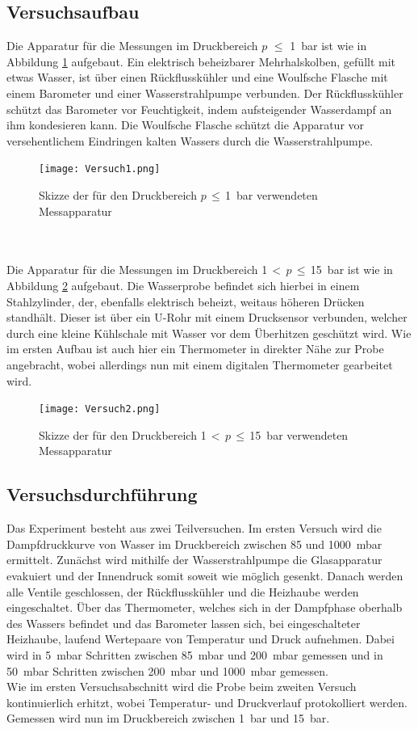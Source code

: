 \documentclass[
  bibliography=totoc,     %
  captions=tableheading,  %
  titlepage=firstiscover, %
]{scrartcl}
\begin{document}
\subsection{Versuchsaufbau}
\label{sec:versuchsaufbau}
Die Apparatur für die Messungen im Druckbereich $p$ $\le$ \SI{1}{\bar} ist
wie in Abbildung \ref{fig:versuch1} aufgebaut.
Ein elektrisch beheizbarer Mehrhalskolben, gefüllt mit etwas Wasser, ist über
einen Rückflusskühler und eine Woulfsche Flasche mit einem Barometer und einer
Wasserstrahlpumpe verbunden. Der Rückflusskühler schützt das Barometer vor
Feuchtigkeit, indem aufsteigender Wasserdampf an ihm kondesieren kann. Die
Woulfsche Flasche schützt die Apparatur vor versehentlichem Eindringen kalten
Wassers durch die Wasserstrahlpumpe.
\begin{figure}[htb]
  \centering
  \texttt{[image: Versuch1.png]}
  \caption{Skizze der für den Druckbereich $p$\,$\le$\,\SI{1}{\bar} verwendeten Messapparatur \cite{anleitung}}
  \label{fig:versuch1}
\end{figure}\\
\\
Die Apparatur für die Messungen im Druckbereich \num{1}\,$<$\,$p$\,$\le$\,\SI{15}{\bar}
ist wie in Abbildung \ref{fig:versuch2} aufgebaut.
Die Wasserprobe befindet sich hierbei in einem Stahlzylinder, der, ebenfalls
elektrisch beheizt, weitaus höheren Drücken standhält. Dieser ist über ein
U-Rohr mit einem Drucksensor verbunden, welcher durch eine kleine Kühlschale mit
Wasser vor dem Überhitzen geschützt wird. Wie im ersten Aufbau ist auch hier ein
Thermometer in direkter Nähe zur Probe angebracht, wobei allerdings nun mit
einem digitalen Thermometer gearbeitet wird.
\begin{figure}[htb]
  \centering
  \texttt{[image: Versuch2.png]}
  \caption{Skizze der für den Druckbereich \num{1}\,$<$\,$p$\,$\le$\,\SI{15}{\bar} verwendeten Messapparatur \cite{anleitung}}
  \label{fig:versuch2}
\end{figure}
\subsection{Versuchsdurchführung}
\label{sec:versuchsdurcführung}
Das Experiment besteht aus zwei Teilversuchen. Im ersten Versuch wird die
Dampfdruckkurve von Wasser im Druckbereich zwischen \num{85} und
\SI{1000}{\milli\bar} ermittelt. Zunächst wird mithilfe der Wasserstrahlpumpe
die Glasapparatur evakuiert und der Innendruck somit soweit wie möglich gesenkt.
Danach werden alle Ventile geschlossen, der Rückflusskühler und die Heizhaube
werden eingeschaltet. Über das Thermometer, welches sich in der Dampfphase
oberhalb des Wassers befindet und das Barometer lassen sich, bei eingeschalteter
Heizhaube, laufend Wertepaare von Temperatur und Druck aufnehmen. Dabei wird in
\SI{5}{\milli\bar} Schritten zwischen \SI{85}{\milli\bar} und \SI{200}{\milli\bar}
gemessen und in \SI{50}{\milli\bar} Schritten zwischen \SI{200}{\milli\bar} und
\SI{1000}{\milli\bar} gemessen.\\
Wie im ersten Versuchsabschnitt wird die Probe beim zweiten Versuch kontinuierlich erhitzt, wobei
Temperatur- und Druckverlauf protokolliert werden. Gemessen wird nun im Druckbereich
zwischen \SI{1}{\bar} und \SI{15}{\bar}.
\end{document}
